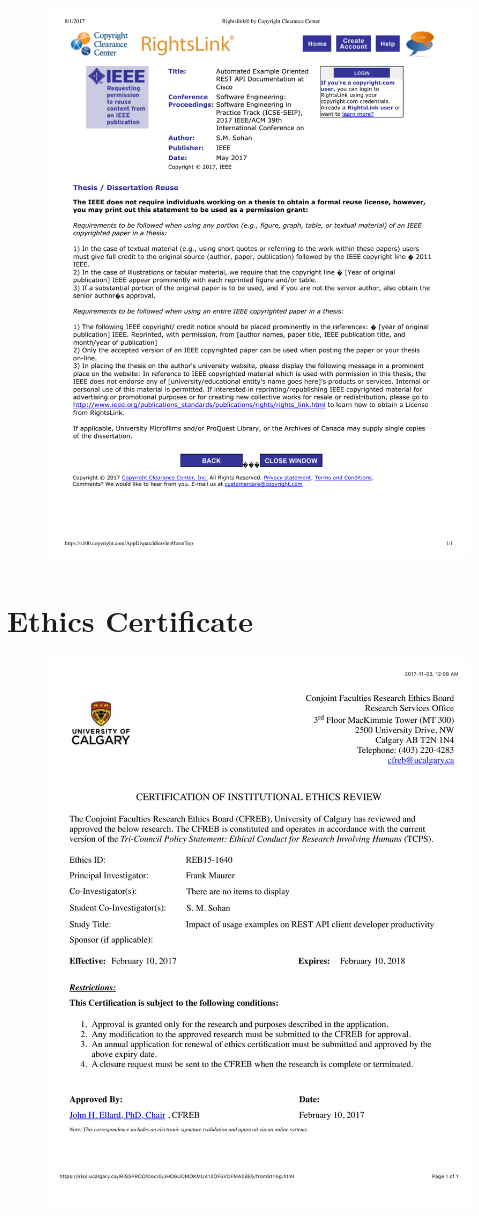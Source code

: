 \begin{figure}
 \centering
 \includegraphics[width=\textwidth]{copyrights/cisco_paper.pdf}
\end{figure}
\chapter{Ethics Certificate}
\label{ethics}
\begin{figure}
 \centering
 \includegraphics[width=\textwidth]{ethics.pdf}
\end{figure}

